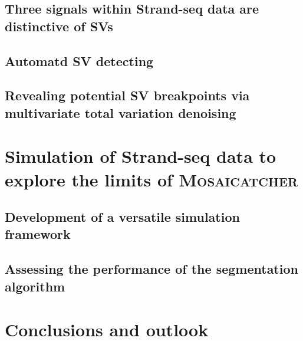 \subsection{Three signals within Strand-seq data are distinctive of SVs}
\label{sec:mosaic_concept}



\subsection{Automatd SV detecting}
\label{sec:mosaic_method}



\subsection{Revealing potential SV breakpoints via multivariate total variation denoising}
\label{sec:mosaic_segmentation}


\FloatBarrier
\section{Simulation of Strand-seq data to explore the limits of \textsc{Mosaicatcher}}
\label{sec:mosaic_simul}

\subsection{Development of a versatile simulation framework}

\subsection{Assessing the performance of the segmentation algorithm}

\section{Conclusions and outlook}
\label{sec:mosaic_conclusion}


